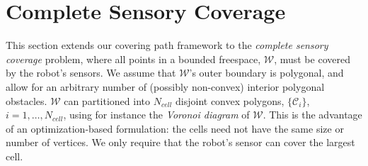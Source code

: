 \documentclass[letterpaper, 10 pt, conference]{ieeeconf}
\theoremstyle{definition}
\newcommand{\Cs}{\mathcal{C}}
\newcommand{\Ws}{\mathcal{W}}
\begin{document}
\section{Complete Sensory Coverage}\label{sec:complete_coverage}

\noindent This section extends our covering path framework to the {\em complete sensory coverage} problem, where all points in a bounded freespace, $\Ws$, must be covered by the robot's sensors.  We assume that $\Ws$'s outer boundary is polygonal, and allow for an arbitrary number of (possibly non-convex) interior polygonal obstacles.  $\mathcal{W}$ can partitioned into $N_{cell}$ disjoint convex polygons, $\{\Cs_i\}$, $i=1,\ldots,N_{cell}$, using for instance the {\em Voronoi diagram} of $\Ws$. %
This is the advantage of an optimization-based formulation: the cells need not have the same size or number of vertices. We only require that the robot's sensor can cover the largest cell.  
%
\end{document}
